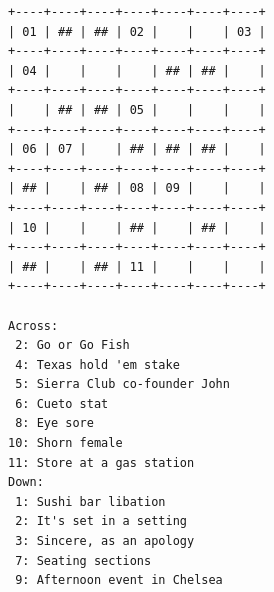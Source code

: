 \begin{lstlisting}[basicstyle = \ttfamily\scriptsize]
+----+----+----+----+----+----+----+
| 01 | ## | ## | 02 |    |    | 03 |
+----+----+----+----+----+----+----+
| 04 |    |    |    | ## | ## |    |
+----+----+----+----+----+----+----+
|    | ## | ## | 05 |    |    |    |
+----+----+----+----+----+----+----+
| 06 | 07 |    | ## | ## | ## |    |
+----+----+----+----+----+----+----+
| ## |    | ## | 08 | 09 |    |    |
+----+----+----+----+----+----+----+
| 10 |    |    | ## |    | ## |    |
+----+----+----+----+----+----+----+
| ## |    | ## | 11 |    |    |    |
+----+----+----+----+----+----+----+

Across:
 2: Go or Go Fish
 4: Texas hold 'em stake
 5: Sierra Club co-founder John
 6: Cueto stat
 8: Eye sore
10: Shorn female
11: Store at a gas station
Down:
 1: Sushi bar libation
 2: It's set in a setting
 3: Sincere, as an apology
 7: Seating sections
 9: Afternoon event in Chelsea
\end{lstlisting}